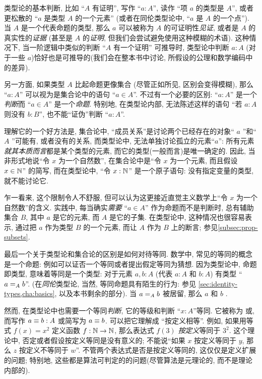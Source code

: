 类型论的基本判断, 比如 ``$A$ 有证明'', 写作 ``$a:A$'', 读作 ``项 $a$ 的类型是 $A$'', 或者更松散的 ``$a$ 是类型 $A$ 的一个元素'' (或者在同伦类型论中, ``$a$ 是 $A$ 的一个点'').
%
%
%
当 $A$ 是一个代表命题的类型, 那么 $a$ 可以被称为 $A$ 的可证明性\emph{见证}, 或者是 $A$ 的真实性的\emph{证据}
(甚至是 $A$ 的\emph{证明}, 但我们会尝试避免使用这种模糊的术语).
这种情况下, 当一阶逻辑中类似的判断 ``$A$ 有一个证明'' 可推导时, 类型论中判断 $a:A$ (对于一些 $a$)恰好也是可推导的(我们会在整本书中讨论, 所假设的公理和数学编码中的差异).

另一方面, 如果类型 $A$ 比起命题更像集合 (尽管正如所见, 区别会变得模糊), 那么 ``$a:A$'' 可以视为是集合论中的语句 ``$a\in A$''.
不过有一个必要的区别: ``$a:A$'' 是一个\emph{判断}而 ``$a\in A$'' 是一个\emph{命题}.
特别地, 在类型论内部, 无法陈述这样的语句 ``若 $a:A$ 则没有 $b:B$'', 也不能``证伪''判断 ``$a:A$''.

理解它的一个好方法是, 集合论中, ``成员关系''是讨论两个已经存在的对象`` $a$ ''和`` $A$ ''可能有, 或者没有的关系, 而类型论中, 无法单独讨论孤立的元素``$a$'': 所有元素\emph{就其本质而言}都是某个类型的元素, 而它的类型(一般而言)是唯一确定的.
因此, 当非形式地说``令 $x$ 为一个自然数'', 在集合论中是``令 $x$ 为一个元素, 而且假设 $x\in\nat$'' 的简写, 而在类型论中, ``令 $x:\nat$'' 是一个原子语句: 没有指定变量的类型, 就不能讨论它.
%

乍一看来, 这个限制令人不舒服, 但可以认为这更接近直觉主义数学上``令 $x$ 为一个自然数''的含义.
实践中, 每当确实\emph{需要} ``$a\in A$'' 作为命题而不是判断时, 总有辅助集合 $B$, 其中 $a$ 是它的元素, 而 $A$ 是它的子集.
在类型论中, 这种情况也很容易表示, 通过把 $a$ 作为类型 $B$ 的一个元素, 而让 $A$ 作为 $B$ 上的断言;
参见\cref{subsec:prop-subsets}.

最后一个关于类型论和集合论的区别是如何对待等同.
数学中, 常见的等同的概念是一个命题: 例如可以证否一个等同或者提出假定等同为猜想.
因为类型论中, 命题即类型, 意味着等同是一个类型: 对于元素 $a,b:A$ (代表 $a:A$ 和 $b:A$) 有类型 ``$\id[A]ab$''.
(在\emph{同伦}类型论, 当然, 等同命题具有陌生的行为: 参见 \cref{sec:identity-types,cha:basics}, 以及本书剩余的部分).
当 $\id[A]ab$ 被居留, 那么 $a$ 和 $b$ .
%
%

然而, 在类型论中也需要一个等同\emph{判断}, 它的等级和判断 ``$x:A$''等同.
%
%
它被称为%
%
%
或,
%
%
而写作 $a\jdeq b : A$ 或简写为 $a \jdeq b$.
可以把它理解成 ``按定义相等''.
例如, 如果用等式 $f(x)=x^2$ 定义函数 $f:\nat\to\nat$, 那么表达式 $f(3)$ \emph{按定义}等同于 $3^2$.
这个理论中, 否定或者假设按定义等同是没有意义的;
不能说``如果 $x$ 按定义等同于 $y$, 那么 $z$ 按定义不等同于 $w$''.
不管两个表达式是否是按定义等同的, 这仅仅是定义扩展的问题;
特别地, 这些都是算法可判定的的问题(尽管算法是元理论的, 而不是理论内部的).
%

